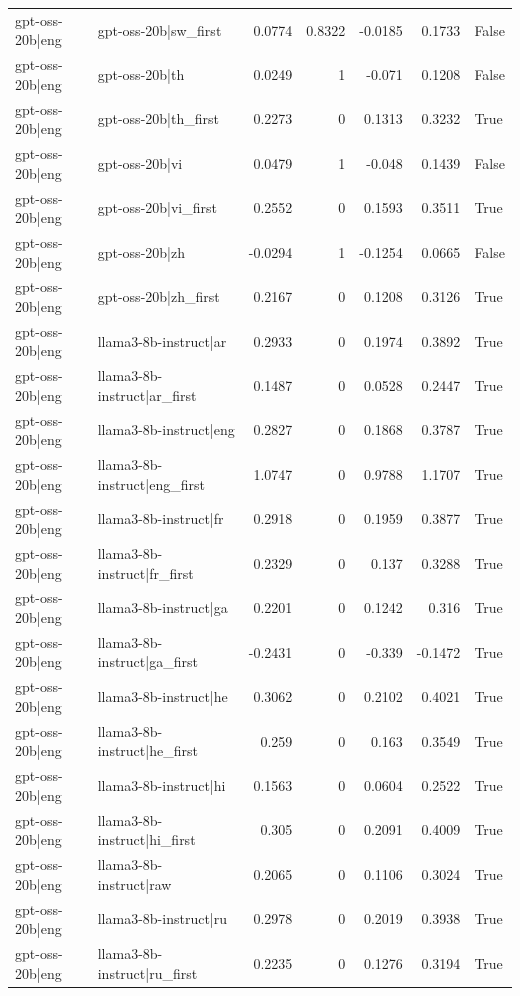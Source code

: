 \begin{table}
\begin{tabular}{l l r r r r l}
gpt-oss-20b|eng & gpt-oss-20b|sw_first & 0.0774 & 0.8322 & -0.0185 & 0.1733 & False \\
gpt-oss-20b|eng & gpt-oss-20b|th & 0.0249 & 1 & -0.071 & 0.1208 & False \\
gpt-oss-20b|eng & gpt-oss-20b|th_first & 0.2273 & 0 & 0.1313 & 0.3232 & True \\
gpt-oss-20b|eng & gpt-oss-20b|vi & 0.0479 & 1 & -0.048 & 0.1439 & False \\
gpt-oss-20b|eng & gpt-oss-20b|vi_first & 0.2552 & 0 & 0.1593 & 0.3511 & True \\
gpt-oss-20b|eng & gpt-oss-20b|zh & -0.0294 & 1 & -0.1254 & 0.0665 & False \\
gpt-oss-20b|eng & gpt-oss-20b|zh_first & 0.2167 & 0 & 0.1208 & 0.3126 & True \\
gpt-oss-20b|eng & llama3-8b-instruct|ar & 0.2933 & 0 & 0.1974 & 0.3892 & True \\
gpt-oss-20b|eng & llama3-8b-instruct|ar_first & 0.1487 & 0 & 0.0528 & 0.2447 & True \\
gpt-oss-20b|eng & llama3-8b-instruct|eng & 0.2827 & 0 & 0.1868 & 0.3787 & True \\
gpt-oss-20b|eng & llama3-8b-instruct|eng_first & 1.0747 & 0 & 0.9788 & 1.1707 & True \\
gpt-oss-20b|eng & llama3-8b-instruct|fr & 0.2918 & 0 & 0.1959 & 0.3877 & True \\
gpt-oss-20b|eng & llama3-8b-instruct|fr_first & 0.2329 & 0 & 0.137 & 0.3288 & True \\
gpt-oss-20b|eng & llama3-8b-instruct|ga & 0.2201 & 0 & 0.1242 & 0.316 & True \\
gpt-oss-20b|eng & llama3-8b-instruct|ga_first & -0.2431 & 0 & -0.339 & -0.1472 & True \\
gpt-oss-20b|eng & llama3-8b-instruct|he & 0.3062 & 0 & 0.2102 & 0.4021 & True \\
gpt-oss-20b|eng & llama3-8b-instruct|he_first & 0.259 & 0 & 0.163 & 0.3549 & True \\
gpt-oss-20b|eng & llama3-8b-instruct|hi & 0.1563 & 0 & 0.0604 & 0.2522 & True \\
gpt-oss-20b|eng & llama3-8b-instruct|hi_first & 0.305 & 0 & 0.2091 & 0.4009 & True \\
gpt-oss-20b|eng & llama3-8b-instruct|raw & 0.2065 & 0 & 0.1106 & 0.3024 & True \\
gpt-oss-20b|eng & llama3-8b-instruct|ru & 0.2978 & 0 & 0.2019 & 0.3938 & True \\
gpt-oss-20b|eng & llama3-8b-instruct|ru_first & 0.2235 & 0 & 0.1276 & 0.3194 & True \\

\end{tabular}
\end{table}

